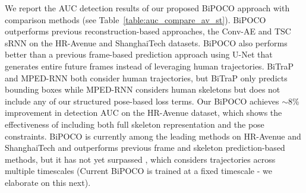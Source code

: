 \documentclass[nohyperref]{article}
\theoremstyle{plain}
\theoremstyle{definition}
\theoremstyle{remark}
\begin{document}
\vspace{-1mm}

We report the AUC detection results of our proposed BiPOCO approach with comparison methods (see Table~\ref{table:auc_compare_av_st}). BiPOCO outperforms  previous reconstruction-based approaches, the Conv-AE \cite{hasan2016learning} and TSC sRNN \cite{luo2017revisit} on the HR-Avenue and ShanghaiTech datasets. BiPOCO also performs  better than a previous frame-based prediction approach using U-Net \cite{liu2018future} that generates entire future frames instead of leveraging human trajectories. BiTraP \cite{kanu2021leveraging} and MPED-RNN \cite{morais2019learning} both consider human trajectories, but BiTraP only predicts bounding boxes while MPED-RNN considers human skeletons but does not include any of our structured pose-based loss terms. Our BiPOCO achieves $\sim$8\% improvement in detection AUC on the HR-Avenue dataset, which shows the effectiveness of including both full skeleton representation  and the pose constraints. BiPOCO  is currently among the leading methods on HR-Avenue and ShanghaiTech and outperforms previous frame and skeleton prediction-based methods, but it has not yet surpassed \cite{rodrigues2020multi}, which considers trajectories across multiple timescales (Current BiPOCO is trained at a fixed timescale - we elaborate on this next).





\vspace{-5mm}

\begin{table}[h!]
\centering
\caption{AUC comparison results with existing methods.}
\label{table:auc_compare_av_st}
\end{table}
\end{document}
